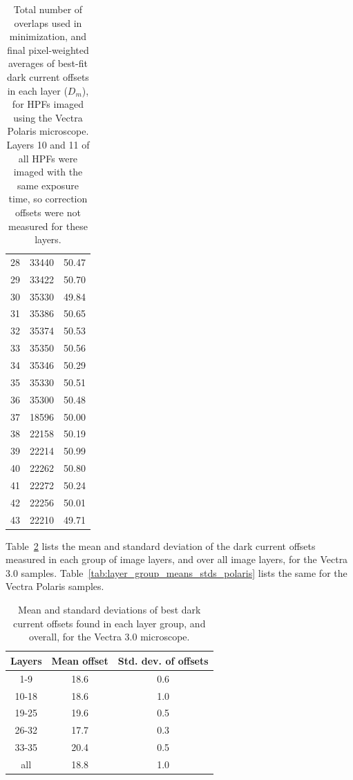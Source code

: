 \documentclass[letterpaper,11pt]{article}
\newcommand{\reftab}[1]{Table~\ref{#1}}
\begin{document}
\begin{table}[!htb]
\begin{tabular}{c c c}
28              & 33440              & 50.47 \\
29              & 33422              & 50.70 \\
30              & 35330              & 49.84 \\
31              & 35386              & 50.65 \\
32              & 35374              & 50.53 \\
33              & 35350              & 50.56 \\
34              & 35346              & 50.29 \\
35              & 35330              & 50.51 \\
36              & 35300              & 50.48 \\
37              & 18596              & 50.00 \\
38              & 22158              & 50.19 \\
39              & 22214              & 50.99 \\
40              & 22262              & 50.80 \\
41              & 22272              & 50.24 \\
42              & 22256              & 50.01 \\
43              & 22210              & 49.71 \\
\hline
\end{tabular}
\caption{\footnotesize Total number of overlaps used in minimization, and final pixel-weighted averages of best-fit dark current offsets in each layer ($D_{m}$), for HPFs imaged using the Vectra Polaris microscope. Layers 10 and 11 of all HPFs were imaged with the same exposure time, so correction offsets were not measured for these layers.}
\label{tab:best_offsets_polaris}
\end{table}

\reftab{tab:layer_group_means_stds_vectra} lists the mean and standard deviation of the dark current offsets measured in each group of image layers, and over all image layers, for the Vectra 3.0 samples. \reftab{tab:layer_group_means_stds_polaris} lists the same for the Vectra Polaris samples.

\begin{table}[!htb]
\centering
\begin{tabular}{c c c}
Layers & Mean offset & Std. dev. of offsets \\
\hline \hline
1-9    & 18.6        & 0.6 \\
10-18  & 18.6        & 1.0 \\
19-25  & 19.6        & 0.5 \\
26-32  & 17.7        & 0.3 \\
33-35  & 20.4        & 0.5 \\
\hline
all    & 18.8        & 1.0 \\
\hline \hline
\end{tabular}
\caption{\footnotesize Mean and standard deviations of best dark current offsets found in each layer group, and overall, for the Vectra 3.0 microscope.}
\label{tab:layer_group_means_stds_vectra}
\end{table}
\end{document}

